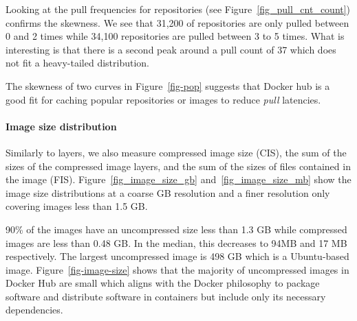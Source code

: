 Looking at the pull frequencies for repositories (see Figure~\ref{fig_pull_cnt_count})
confirms the skewness. We see that 31,200 of repositories are only pulled between 0 and
2 times while 34,100 repositories are pulled between 3 to 5 times. What is interesting is
that there is a second peak around a pull count of 37 which does not fit a heavy-tailed
distribution.


The skewness of two curves in Figure~\ref{fig-pop} suggests that Docker hub is
a good fit for caching popular repositories or images to
reduce \textit{pull} latencies.


\paragraph{Image size distribution}
\label{sec:image-size}





Similarly to layers, we also measure compressed image size
(CIS), \ie the sum of the sizes of the compressed image layers, and the sum of the
sizes of files contained in the image (FIS). Figure~\ref{fig_image_size_gb}
and~\ref{fig_image_size_mb} show the image size distributions at a coarse GB resolution
and a finer resolution only covering images less than 1.5 GB.

90\% of the images have an uncompressed size less than 1.3 GB while compressed images
are less than 0.48 GB. In the median, this decreases to 94MB and 17 MB respectively.
The largest uncompressed image is 498 GB which is a Ubuntu-based image.
Figure~\ref{fig-image-size} shows that the majority of uncompressed images in Docker Hub are
small which aligns with the Docker philosophy to package software and distribute
software in containers but include only its necessary dependencies.


